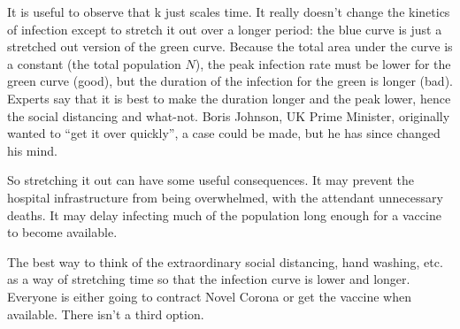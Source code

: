 \documentclass{article}
\begin{document}
It is useful to observe that k just scales time.  It really
doesn't change the kinetics of infection except to stretch it out over
a longer period: the blue curve is just a stretched out version of the
green curve.  Because the total area under the curve is a constant
(the total population $N$), the peak infection rate must be lower for
the green curve (good), but the duration of the infection for the
green is longer (bad).  Experts say that it is best to make the
duration longer and the peak lower, hence the social distancing and
what-not.  Boris Johnson, UK Prime Minister, originally wanted to
``get it over quickly'', a case could be made, but he has since
changed his mind.

So stretching it out can have some useful consequences.  It may
prevent the hospital infrastructure from being overwhelmed, with the
attendant unnecessary deaths.  It may delay infecting much of the
population long enough for a vaccine to become available.

The best way to think of the extraordinary social distancing, hand
washing, etc. as a way of stretching time so that the infection curve
is lower and longer.  Everyone is either going to contract Novel
Corona or get the vaccine when available.  There isn't a third option.
\end{document}
